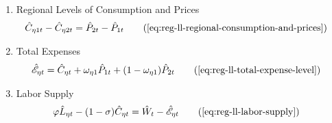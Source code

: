 \documentclass[
thesis.tex
]{subfiles}
\begin{document}
{\begin{itemize}
\begin{enumerate}
		\item Regional Levels of Consumption and Prices
		\begin{align}
			\hat{C}_{\eta 1 t} - \hat{C}_{\eta 2 t} &= \hat{P}_{2 t} - \hat{P}_{1 t} \tag{\ref{eq:reg-ll-regional-consumption-and-prices}}
		\end{align}
		
		\item Total Expenses
		\begin{align}
			\hat{\mathscr{E}}_{\eta t} &= \hat{C}_{\eta t} + \omega_{\eta 1} \hat{P}_{1 t} + (1 -\omega_{\eta 1}) \hat{P}_{2 t} \tag{\ref{eq:reg-ll-total-expense-level}}
		\end{align}

\begin{comment}
	
		\item Variation of Regional Consumption and Prices
		\begin{align}
			\hat{C}_{\eta t} - \hat{C}_{\eta 1 t} &= (1 -\omega_{\eta 1}) (\hat{P}_{\eta t} - \hat{P}_{\nu t}) \tag{\ref{eq:reg-ll-total-expense-level-2}}
		\end{align}

		\item Regional Consumption of good $\eta$
		\begin{alignat}{2}
			\hat{C}_{\eta 1 t} &= \hat{\mathscr{E}}_{\eta t} - \hat{P}_{\eta t} \tag{\ref{eq:reg-ll-Cn-Cn-2}}
		\end{alignat}

		\item Regional Consumption of good $\nu$
		\begin{alignat}{2}
			\hat{C}_{\eta 2 t} &= \hat{\mathscr{E}}_{\eta t} - \hat{P}_{\eta t} \tag{\ref{eq:reg-ll-Cn-Cv-2}}
		\end{alignat}

		\item Price Composition of Consumption Bundle
		\begin{alignat}{2}
			\hat{\mathscr{E}}_{\eta t} &= \hat{C}_{\eta t} + \omega_{\eta 1} \hat{P}_{\eta t} + (1 -\omega_{\eta 1}) \hat{P}_{\nu t} \tag{\ref{eq:reg-ll-total-expense-level}}
		\end{alignat}
	
\end{comment}

		\item Labor Supply
		\begin{alignat}{2}
			\varphi \hat{L}_{\eta t} - (1 -\sigma) \hat{C}_{\eta t} &= \hat{W}_t - \hat{ \mathscr{E} }_{\eta t} \tag{\ref{eq:reg-ll-labor-supply}}
		\end{alignat}
		

\end{enumerate}
\end{itemize}}
\end{document}
